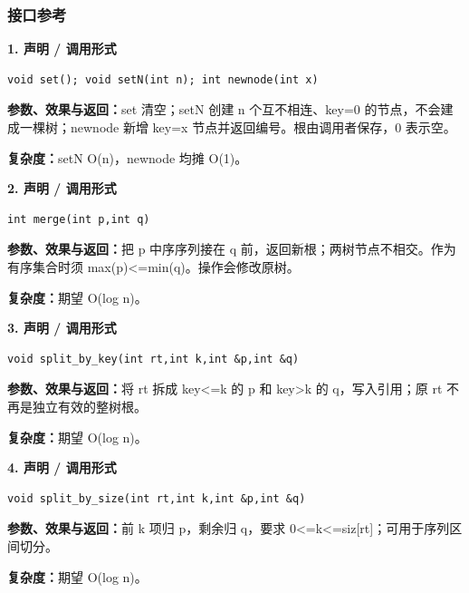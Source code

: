\documentclass[UTF8,a4paper,10pt]{ctexart}
\begin{document}
\subsubsection*{接口参考}
\noindent\begin{minipage}{\textwidth}
\textbf{1. 声明 / 调用形式}
\begin{lstlisting}
void set(); void setN(int n); int newnode(int x)
\end{lstlisting}
\textbf{参数、效果与返回：}set 清空；setN 创建 n 个互不相连、key=0 的节点，不会建成一棵树；newnode 新增 key=x 节点并返回编号。根由调用者保存，0 表示空。

\textbf{复杂度：}setN O(n)，newnode 均摊 O(1)。

\end{minipage}\par\vspace{0.4em}
\noindent\begin{minipage}{\textwidth}
\textbf{2. 声明 / 调用形式}
\begin{lstlisting}
int merge(int p,int q)
\end{lstlisting}
\textbf{参数、效果与返回：}把 p 中序序列接在 q 前，返回新根；两树节点不相交。作为有序集合时须 max(p)<=min(q)。操作会修改原树。

\textbf{复杂度：}期望 O(log n)。

\end{minipage}\par\vspace{0.4em}
\noindent\begin{minipage}{\textwidth}
\textbf{3. 声明 / 调用形式}
\begin{lstlisting}
void split_by_key(int rt,int k,int &p,int &q)
\end{lstlisting}
\textbf{参数、效果与返回：}将 rt 拆成 key<=k 的 p 和 key>k 的 q，写入引用；原 rt 不再是独立有效的整树根。

\textbf{复杂度：}期望 O(log n)。

\end{minipage}\par\vspace{0.4em}
\noindent\begin{minipage}{\textwidth}
\textbf{4. 声明 / 调用形式}
\begin{lstlisting}
void split_by_size(int rt,int k,int &p,int &q)
\end{lstlisting}
\textbf{参数、效果与返回：}前 k 项归 p，剩余归 q，要求 0<=k<=siz[rt]；可用于序列区间切分。

\textbf{复杂度：}期望 O(log n)。

\end{minipage}\par\vspace{0.4em}
\end{document}

